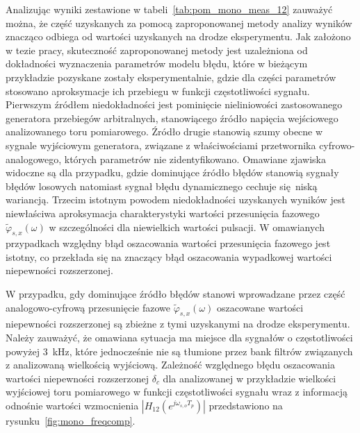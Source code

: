 Analizując wyniki zestawione w tabeli~\ref{tab:pom_mono_meas_12} zauważyć można, że część uzyskanych za pomocą zaproponowanej metody analizy wyników znacząco odbiega od wartości uzyskanych na drodze eksperymentu. Jak założono w tezie pracy, skuteczność zaproponowanej metody jest uzależniona od dokładności wyznaczenia parametrów modelu błędu, które w bieżącym przykładzie pozyskane zostały eksperymentalnie, gdzie dla części parametrów stosowano aproksymacje ich przebiegu w funkcji częstotliwości sygnału. Pierwszym źródłem niedokładności jest pominięcie nieliniowości zastosowanego generatora przebiegów arbitralnych, stanowiącego źródło napięcia wejściowego analizowanego toru pomiarowego. Źródło drugie stanowią szumy obecne w sygnale wyjściowym generatora, związane z właściwościami przetwornika cyfrowo-analogowego, których parametrów nie zidentyfikowano. Omawiane zjawiska widoczne są dla przypadku, gdzie dominujące źródło błędów stanowią sygnały błędów losowych natomiast sygnał błędu dynamicznego cechuje się niską wariancją. Trzecim istotnym powodem niedokładności uzyskanych wyników jest niewłaściwa aproksymacja charakterystyki wartości przesunięcia fazowego $\tilde{\varphi}_{s,x}(\omega)$ w szczególności dla niewielkich wartości pulsacji. W omawianych przypadkach względny błąd oszacowania wartości przesunięcia fazowego jest istotny, co przekłada się na znaczący błąd oszacowania wypadkowej wartości niepewności rozszerzonej.

W przypadku, gdy dominujące źródło błędów stanowi wprowadzane przez część analogowo-cyfrową przesunięcie fazowe $\tilde{\varphi}_{s,x}(\omega)$ oszacowane wartości niepewności rozszerzonej są zbieżne z tymi uzyskanymi na drodze eksperymentu. Należy zauważyć, że omawiana sytuacja ma miejsce dla sygnałów o częstotliwości powyżej \qty{3}{kHz}, które jednocześnie nie są tłumione przez bank filtrów związanych z analizowaną wielkością wyjściową. Zależność względnego błędu oszacowania wartości niepewności rozszerzonej $\delta_{c}$ dla analizowanej w przykładzie wielkości wyjściowej toru pomiarowego w funkcji częstotliwości sygnału wraz z informacją odnośnie wartości wzmocnienia $|H_{12}(e^{j \omega_{s,o} T_{p}})|$ przedstawiono na rysunku~\ref{fig:mono_freqcomp}.


